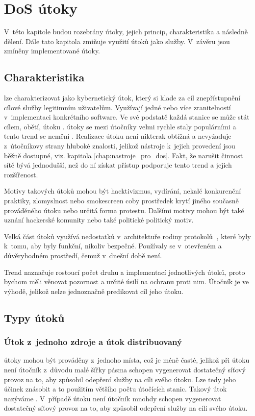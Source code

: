 \chapter[DoS útoky]{DoS útoky}
V~této kapitole budou rozebrány  útoky, jejich princip, charakteristika a následně
dělení. Dále tato kapitola zmiňuje využití  útoků jako služby. V~závěru jsou
zmíněny implementované útoky.

\section{Charakteristika}
 lze charakterizovat jako kybernetický útok, který si klade za cíl znepřístupnění
 cílové služby legitimním uživatelům. Využívají jedné nebo více zranitelností v~implementaci
 konkrétního software. Ve své podstatě každá stanice se může stát cílem, obětí, útoku
 .  útoky se mezi útočníky velmi rychle staly populárními a tento trend
 se nemění \cite{akamai_q2_2017}. Realizace  útoku není nikterak obtížná a
 nevyžaduje z~útočníkovy strany hluboké znalosti, jelikož nástroje k~jejich provedení jsou
 běžně dostupné, viz. kapitola \ref{chap:nastroje_pro_dos}. Fakt, že narušit činnost sítě bývá
 jednodušší, než do ní získat přístup podporuje tento trend a jejich rozšířenost. 

Motivy takových útoků mohou být hacktivizmus, vydírání, nekalé konkurenční praktiky,
zlomyslnost nebo smokescreen coby prostředek krytí jiného současně prováděného útoku nebo
určitá forma protestu. Dalšími motivy mohou být také uznání hackerské komunity nebo také
politické politický motiv.

Velká část útoků využívá nedostatků v~architektuře rodiny protokolů $ \ $,
které byly k~tomu, aby byly funkční, nikoliv bezpečné. Používaly se v~otevřeném a
důvěryhodném prostředí, čemuž v~dnešní době není.

Trend naznačuje rostoucí počet druhu a implementací jednotlivých útoků, proto bychom měli
věnovat pozornost a určité úsilí na ochranu proti nim. Útočník je ve výhodě, jelikož nelze
jednoznačně predikovat cíl jeho útoku.


\section{Typy útoků}
\subsection{Útok z~jednoho zdroje a útok distribuovaný}
\label{subs_ddos}
 útoky mohou být prováděny z~jednoho místa, což je méně časté, jelikož při
 útoku není útočník z~důvodu malé šířky pásma schopen vygenerovat dostatečný síťový
provoz na to, aby způsobil odepření služby na cíli svého útoku. Lze tedy jeho účinek znásobit
a to použitím většího počtu útočících stanic. Takový útok nazýváme .
V~případě  útoku není útočník mnohdy schopen vygenerovat dostatečný síťový provoz
na to, aby způsobil odepření služby na cíli svého útoku.


